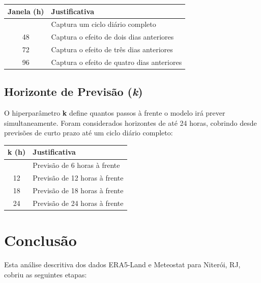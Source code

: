 \documentclass[
  brazilian,
  a4paper,
]{article}
\newcounter{none} %
\begin{document}
{\def\LTcaptype{none} %
\begin{longtable}[]{@{}cl@{}}
\toprule\noalign{}
Janela (h) & Justificativa \\
\midrule\noalign{}
\endhead
\bottomrule\noalign{}
\endlastfoot
24 & Captura um ciclo diário completo \\
48 & Captura o efeito de dois dias anteriores \\
72 & Captura o efeito de três dias anteriores \\
96 & Captura o efeito de quatro dias anteriores \\
\end{longtable}
}

\subsection{\texorpdfstring{Horizonte de Previsão
(\emph{k})}{Horizonte de Previsão (k)}}\label{horizonte-de-previsuxe3o-k}

O hiperparâmetro \textbf{k} define quantos passos à frente o modelo irá
prever simultaneamente. Foram considerados horizontes de até 24 horas,
cobrindo desde previsões de curto prazo até um ciclo diário completo:

{\def\LTcaptype{none} %
\begin{longtable}[]{@{}cl@{}}
\toprule\noalign{}
k (h) & Justificativa \\
\midrule\noalign{}
\endhead
\bottomrule\noalign{}
\endlastfoot
6 & Previsão de 6 horas à frente \\
12 & Previsão de 12 horas à frente \\
18 & Previsão de 18 horas à frente \\
24 & Previsão de 24 horas à frente \\
\end{longtable}
}

\section{Conclusão}\label{conclusuxe3o}

Esta análise descritiva dos dados ERA5-Land e Meteostat para Niterói,
RJ, cobriu as seguintes etapas:
\end{document}
